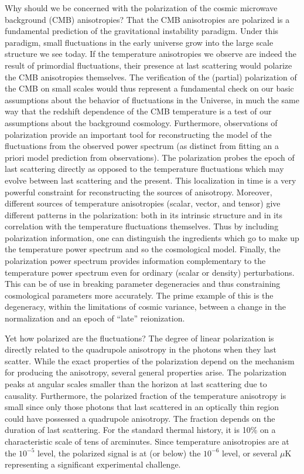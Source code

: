 \documentclass[a4paper,11pt]{article}
\begin{document}
{\noindent}Why should we be concerned with the polarization of the cosmic microwave background (CMB) anisotropies? That the CMB anisotropies are polarized is a fundamental prediction of the gravitational instability paradigm. Under this paradigm, small fluctuations in the early universe grow into the large scale structure we see today. If the temperature anisotropies we observe are indeed the result of primordial fluctuations, their presence at last scattering would polarize the CMB anisotropies themselves. The verification of the (partial) polarization of the CMB on small scales would thus represent a fundamental check on our basic assumptions about the behavior of fluctuations in the Universe, in much the same way that the redshift dependence of the CMB temperature is a test of our assumptions about the background cosmology. Furthermore, observations of polarization provide an important tool for reconstructing the model of the fluctuations from the observed power spectrum (as distinct from fitting an a priori model prediction from observations). The polarization probes the epoch of last scattering directly as opposed to the temperature fluctuations which may evolve between last scattering and the present. This localization in time is a very powerful constraint for reconstructing the sources of anisotropy. Moreover, different sources of temperature anisotropies (scalar, vector, and tensor) give different patterns in the polarization: both in its intrinsic structure and in its correlation with the temperature fluctuations themselves. Thus by including polarization information, one can distinguish the ingredients which go to make up the temperature power spectrum and so the cosmological model. Finally, the polarization power spectrum provides information complementary to the temperature power spectrum even for ordinary (scalar or density) perturbations. This can be of use in breaking parameter degeneracies and thus constraining cosmological parameters more accurately. The prime example of this is the degeneracy, within the limitations of cosmic variance, between a change in the normalization and an epoch of ``late'' reionization.

{\noindent}Yet how polarized are the fluctuations? The degree of linear polarization is directly related to the quadrupole anisotropy in the photons when they last scatter. While the exact properties of the polarization depend on the mechanism for producing the anisotropy, several general properties arise. The polarization peaks at angular scales smaller than the horizon at last scattering due to causality. Furthermore, the polarized fraction of the temperature anisotropy is small since only those photons that last scattered in an optically thin region could have possessed a quadrupole anisotropy. The fraction depends on the duration of last scattering. For the standard thermal history, it is 10\% on a characteristic scale of tens of arcminutes. Since temperature anisotropies are at the $10^{-5}$ level, the polarized signal is at (or below) the $10^{-6}$ level, or several $\mu\mathrm{K}$ representing a significant experimental challenge.
\end{document}
